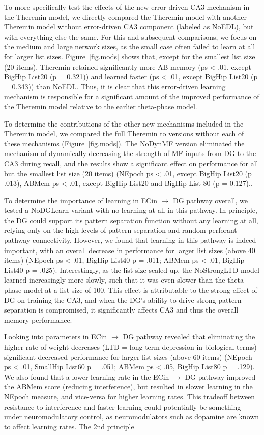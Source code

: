 \documentclass[11pt,twoside]{article}
\newif\myifpdf
\begin{document}
To more specifically test the effects of the new error-driven CA3 mechanism in the Theremin model, we directly compared the Theremin model with another Theremin model without error-driven CA3 component (labeled as NoEDL), but with everything else the same. For this and subsequent comparisons, we focus on the medium and large network sizes, as the small case often failed to learn at all for larger list sizes.  Figure~\ref{fig.mods} shows that, except for the smallest list size (20 items), Theremin retained significantly more AB memory (ps < .01, except BigHip List20 (p = 0.321)) and learned faster (ps < .01, except BigHip List20 (p = 0.343)) than NoEDL.  Thus, it is clear that this error-driven learning mechanism is responsible for a significant amount of the improved performance of the Theremin model relative to the earlier theta-phase model.

To determine the contributions of the other new mechanisms included in the Theremin model, we compared the full Theremin to versions without each of these mechanisms (Figure~\ref{fig.mods}).  The NoDynMF version eliminated the mechanism of dynamically decreasing the strength of MF inputs from DG to the CA3 during recall, and the results show a significant effect on performance for all but the smallest list size (20 items) (NEpoch ps < .01, except BigHip List20 (p = .013), ABMem ps < .01, except BigHip List20 and BigHip List 80 (p = 0.127).. 

To determine the importance of learning in ECin $\rightarrow$ DG pathway overall, we tested a NoDGLearn variant with no learning at all in this pathway.  In principle, the DG could support its pattern separation function without any learning at all, relying only on the high levels of pattern separation and random perforant pathway connectivity.  However, we found that learning in this pathway is indeed important, with an overall decrease in performance for larger list sizes (above 40 items) (NEpoch ps < .01, BigHip List40 p = .011; ABMem ps < .01, BigHip List40 p = .025).  Interestingly, as the list size scaled up, the NoStrongLTD model learned increasingly more slowly, such that it was even slower than the theta-phase model at a list size of 100. This effect is attributable to the strong effect of DG on training the CA3, and when the DG's ability to drive strong pattern separation is compromised, it significantly affects CA3 and thus the overall memory performance.

Looking into parameters in ECin $\rightarrow$ DG pathway revealed that eliminating the higher rate of weight decreases (LTD = long-term depression in biological terms) significant decreased performance for larger list sizes (above 60 items) (NEpoch ps < .01, SmallHip List60 p = .051; ABMem ps < .05, BigHip List80 p = .129).  We also found that a lower learning rate in the ECin $\rightarrow$ DG pathway improved the ABMem score (reducing interference), but resulted in slower learning in the NEpoch measure, and vice-versa for higher learning rates.  This tradeoff between resistance to interference and faster learning could potentially be something under neuromodulatory control, as neuromodulators such as dopamine are known to affect learning rates.  The 2nd principle
\end{document}
